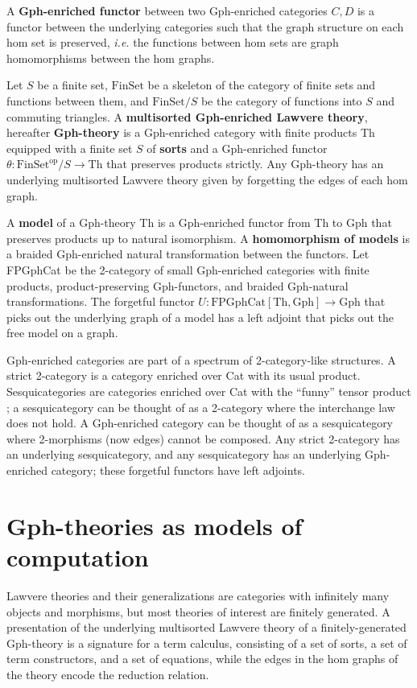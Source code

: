 \documentclass[a4paper,UKenglish]{lipics-v2016}
\newcommand{\maps}{\colon}
\newcommand{\Th}{\mathrm{Th}}
\newcommand{\Gph}{\mathrm{Gph}}
\newcommand{\FinSet}{\mathrm{FinSet}}
\newcommand{\FPGphCat}{\mathrm{FPGphCat}}
\newcommand{\op}{\mathrm{op}}
\begin{document}
A {\bf Gph-enriched functor} between two Gph-enriched categories $C, D$ is a functor between the underlying categories such that the graph structure on each hom set is preserved, {\em i.e.} the functions between hom sets are graph homomorphisms between the hom graphs.

Let $S$ be a finite set, $\FinSet$ be a skeleton of the category of finite sets and functions between them, and $\FinSet/S$ be the category of functions into $S$ and commuting triangles.  A {\bf multisorted Gph-enriched Lawvere theory}, hereafter {\bf Gph-theory} is a Gph-enriched category with finite products Th equipped with a finite set $S$ of {\bf sorts} and a Gph-enriched functor $\theta\maps \FinSet^{\op}/S \to \Th$ that preserves products strictly.  Any Gph-theory has an underlying multisorted Lawvere theory given by forgetting the edges of each hom graph.

A {\bf model} of a Gph-theory Th is a Gph-enriched functor from Th to Gph that preserves products up to natural isomorphism.  A {\bf homomorphism of models} is a braided Gph-enriched natural transformation between the functors.  Let FPGphCat be the 2-category of small Gph-enriched categories with finite products, product-preserving Gph-functors, and braided Gph-natural transformations.  The forgetful functor $U\maps \FPGphCat[\Th, \Gph] \to \Gph$ that picks out the underlying graph of a model has a left adjoint that picks out the free model on a graph.

Gph-enriched categories are part of a spectrum of 2-category-like structures.  A strict 2-category is a category enriched over Cat with its usual product.  Sesquicategories are categories enriched over Cat with the ``funny'' tensor product \cite{Lack2010}; a sesquicategory can be thought of as a 2-category where the interchange law does not hold.  A Gph-enriched category can be thought of as a sesquicategory where 2-morphisms (now edges) cannot be composed.  Any strict 2-category has an underlying sesquicategory, and any sesquicategory has an underlying Gph-enriched category; these forgetful functors have left adjoints.

\section{Gph-theories as models of computation}

Lawvere theories and their generalizations are categories with infinitely many objects and morphisms, but most theories of interest are finitely generated.  A presentation of the underlying multisorted Lawvere theory of a finitely-generated Gph-theory is a signature for a term calculus, consisting of a set of sorts, a set of term constructors, and a set of equations, while the edges in the hom graphs of the theory encode the reduction relation.
\end{document}
